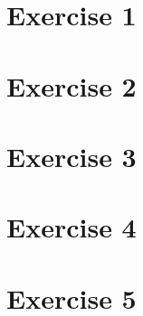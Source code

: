 \documentclass{scrartcl}
\begin{document}
\section*{Exercise 1}



\pagebreak

\section*{Exercise 2}



\pagebreak

\section*{Exercise 3}



\pagebreak

\section*{Exercise 4}



\pagebreak

\section*{Exercise 5}


\end{document}
